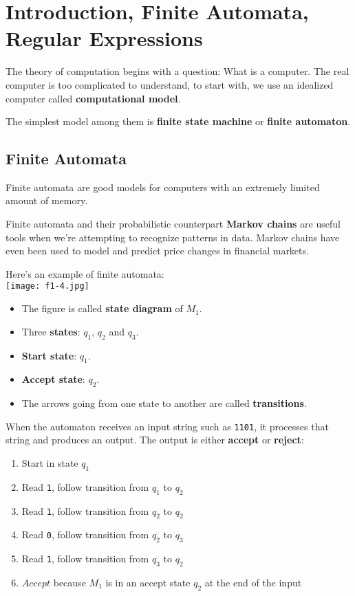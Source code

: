 \chapter{Introduction, Finite Automata, Regular Expressions}

The theory of computation begins with a question: What is a computer. The real computer is too complicated to understand, to start with, we use an idealized computer called \textbf{computational model}. 

The simplest model among them is \textbf{finite state machine} or \textbf{finite automaton}.  

\section{Finite Automata}

Finite automata are good models for computers with an extremely limited amount of memory. 

Finite automata and their probabilistic counterpart \textbf{Markov chains} are useful tools when we're attempting to recognize patterns in data. Markov chains have even been used to model and predict price changes in financial markets.

\begin{eg}
    Here's an example of finite automata:\\
    \texttt{[image: f1-4.jpg]}

    \begin{itemize}
        \item The figure is called \textbf{state diagram} of \(M_1\).
        \item Three \textbf{states}: \(q_1\), \(q_2\) and \(q_3\).
        \item \textbf{Start state}: \(q_1\).   
        \item \textbf{Accept state}: \(q_2\).  
        \item The arrows going from one state to another are called \textbf{transitions}.
    \end{itemize}

    When the automaton receives an input string such as \verb|1101|, it processes that string and produces an output. The output is either \textbf{accept} or \textbf{reject}:
    \begin{enumerate}
        \item Start in state \(q_1\) 
        \item Read \verb|1|, follow transition from \(q_1\) to \(q_2\)  
        \item Read \verb|1|, follow transition from \(q_2\) to \(q_2\)  
        \item Read \verb|0|, follow transition from \(q_2\) to \(q_3\)  
        \item Read \verb|1|, follow transition from \(q_3\) to \(q_2\)  
        \item \(Accept\) because \(M_1\) is in an accept state \(q_2\) at the end of the input   
    \end{enumerate}
\end{eg}

